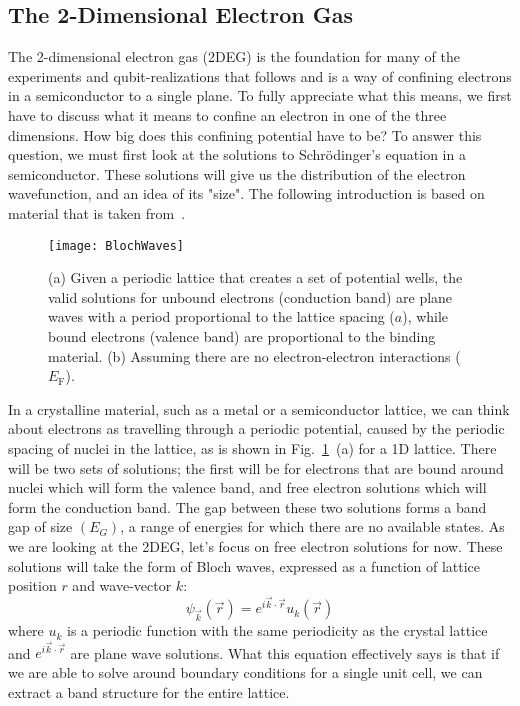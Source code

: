 \subsection{The 2-Dimensional Electron Gas}
The 2-dimensional electron gas (2DEG) is the foundation for many of the experiments and qubit-realizations that follows and
is a way of confining electrons in a semiconductor to a single plane. To fully
appreciate what this means, we first have to discuss what it means to confine an electron in one of the three dimensions.
How big does this confining potential have to be? To answer this question, we must first look at the solutions
to Schr\"odinger's equation in a semiconductor. These solutions will give us the distribution of the electron wavefunction, and
an idea of its "size". The following introduction is based on material that is taken from~\cite{delftbook, ihnbook, Ashcroft}.

\begin{figure}
  \texttt{[image: BlochWaves]}
  \caption[Bloch Waves on a regular lattice]
  {(a) Given a periodic lattice that creates a set of potential wells, the valid solutions for unbound
   electrons (conduction band) are plane waves with a period proportional to the lattice spacing ($a$),
   while bound electrons (valence band) are proportional to the binding material. (b) Assuming there are no
   electron-electron interactions ($E_\textrm{F}$).}
  \label{fig:blochwaves}
\end{figure}

In a crystalline material, such as a metal or a semiconductor lattice, we can think
about electrons as travelling through a periodic potential, caused by the periodic spacing of nuclei in the lattice, as
is shown in Fig.~\ref{fig:blochwaves}~(a) for a 1D lattice. There will be two sets of solutions; the first will be for electrons
that are bound around nuclei which will form the valence band, and free electron solutions which
will form the conduction band. The gap between these two solutions forms a band gap of size $(E_G)$, a range
of energies for which there are no available states. As we are looking at the 2DEG, let's focus on free electron solutions for now.
These solutions will take the form of Bloch waves, expressed as a function of lattice position $r$ and wave-vector $k$:
\begin{equation}
  \psi_{\vec{k}}(\vec{r}) = e^{i\vec{k} \cdot \vec{r}}u_k(\vec{r})
\end{equation}
where $u_k$ is a periodic function with the same periodicity as the crystal lattice and $e^{i\vec{k} \cdot \vec{r}}$ are
plane wave solutions. What this equation effectively says is that if we are able to solve around boundary conditions for
a single unit cell, we can extract a band structure for the entire lattice.

